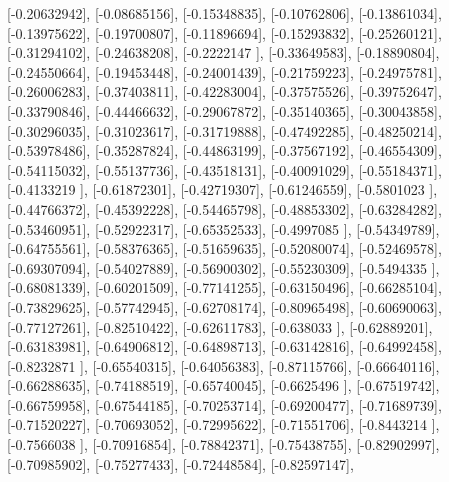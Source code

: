 \documentclass{article}
\begin{document}
       [-0.20632942],
       [-0.08685156],
       [-0.15348835],
       [-0.10762806],
       [-0.13861034],
       [-0.13975622],
       [-0.19700807],
       [-0.11896694],
       [-0.15293832],
       [-0.25260121],
       [-0.31294102],
       [-0.24638208],
       [-0.2222147 ],
       [-0.33649583],
       [-0.18890804],
       [-0.24550664],
       [-0.19453448],
       [-0.24001439],
       [-0.21759223],
       [-0.24975781],
       [-0.26006283],
       [-0.37403811],
       [-0.42283004],
       [-0.37575526],
       [-0.39752647],
       [-0.33790846],
       [-0.44466632],
       [-0.29067872],
       [-0.35140365],
       [-0.30043858],
       [-0.30296035],
       [-0.31023617],
       [-0.31719888],
       [-0.47492285],
       [-0.48250214],
       [-0.53978486],
       [-0.35287824],
       [-0.44863199],
       [-0.37567192],
       [-0.46554309],
       [-0.54115032],
       [-0.55137736],
       [-0.43518131],
       [-0.40091029],
       [-0.55184371],
       [-0.4133219 ],
       [-0.61872301],
       [-0.42719307],
       [-0.61246559],
       [-0.5801023 ],
       [-0.44766372],
       [-0.45392228],
       [-0.54465798],
       [-0.48853302],
       [-0.63284282],
       [-0.53460951],
       [-0.52922317],
       [-0.65352533],
       [-0.4997085 ],
       [-0.54349789],
       [-0.64755561],
       [-0.58376365],
       [-0.51659635],
       [-0.52080074],
       [-0.52469578],
       [-0.69307094],
       [-0.54027889],
       [-0.56900302],
       [-0.55230309],
       [-0.5494335 ],
       [-0.68081339],
       [-0.60201509],
       [-0.77141255],
       [-0.63150496],
       [-0.66285104],
       [-0.73829625],
       [-0.57742945],
       [-0.62708174],
       [-0.80965498],
       [-0.60690063],
       [-0.77127261],
       [-0.82510422],
       [-0.62611783],
       [-0.638033  ],
       [-0.62889201],
       [-0.63183981],
       [-0.64906812],
       [-0.64898713],
       [-0.63142816],
       [-0.64992458],
       [-0.8232871 ],
       [-0.65540315],
       [-0.64056383],
       [-0.87115766],
       [-0.66640116],
       [-0.66288635],
       [-0.74188519],
       [-0.65740045],
       [-0.6625496 ],
       [-0.67519742],
       [-0.66759958],
       [-0.67544185],
       [-0.70253714],
       [-0.69200477],
       [-0.71689739],
       [-0.71520227],
       [-0.70693052],
       [-0.72995622],
       [-0.71551706],
       [-0.8443214 ],
       [-0.7566038 ],
       [-0.70916854],
       [-0.78842371],
       [-0.75438755],
       [-0.82902997],
       [-0.70985902],
       [-0.75277433],
       [-0.72448584],
       [-0.82597147],
\end{document}
